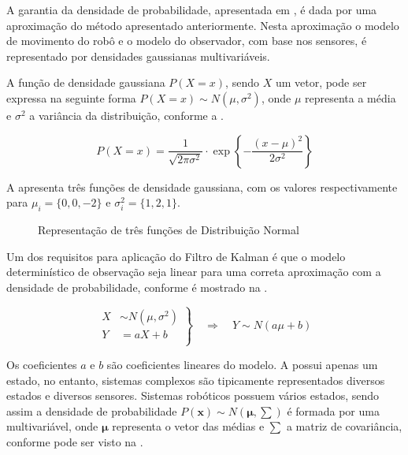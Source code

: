 A garantia da densidade de probabilidade, apresentada em , é dada por uma aproximação do método apresentado anteriormente. Nesta aproximação o modelo de movimento do robô e o modelo do observador, com base nos sensores, é representado por densidades gaussianas multivariáveis.

A função de densidade gaussiana $P(X = x)$, sendo $X$ um vetor, pode ser expressa na seguinte forma ${P(X = x) \sim N(\mu, \sigma^2)}$, onde $\mu$ representa a média e $\sigma^2$ a variância da distribuição, conforme a  .

\begin{equation}
    \label{eq:gauss1}
    P(X = x) = \dfrac{1}{\sqrt{2\pi\sigma^2}}\cdot 
    \exp\left\{-\frac{(x-\mu)^2}{2\sigma^2}\right\}
\end{equation}

A  apresenta três funções de densidade gaussiana, com os valores respectivamente para $\mu_i = \{0,0,-2\}$ e $\sigma^2_i = \{1,2,1\}$.

\begin{figure}[!ht]
    \centering
    
    \caption{Representação de três funções de Distribuição Normal}
    \label{fig::gauss1}
\end{figure}

Um dos requisitos para aplicação do Filtro de Kalman é que o modelo determinístico de observação seja linear para uma correta aproximação com a densidade de probabilidade, conforme é mostrado na  .

\begin{equation}
    \label{eq::linear1d}
    \left.
    \begin{aligned}
            X & \sim N\left(\mu, \sigma^2\right)\\
            Y & = aX + b\\
    \end{aligned} \right\}
    \quad \Rightarrow \quad Y \sim N\left(a\mu+b\right)
\end{equation}

Os coeficientes $a$ e $b$ são coeficientes lineares do modelo. A  possui apenas um estado, no entanto, sistemas complexos são tipicamente representados diversos estados e diversos sensores.
Sistemas robóticos possuem vários estados, sendo assim a densidade de probabilidade ${P(\mathbf{x}) \sim N(\boldsymbol{\mu}, \textstyle\sum)}$ é formada por uma  multivariável, onde $\boldsymbol{\mu}$ representa o vetor das médias e ${\textstyle\sum}$ a matriz de covariância, conforme pode ser visto na  .

